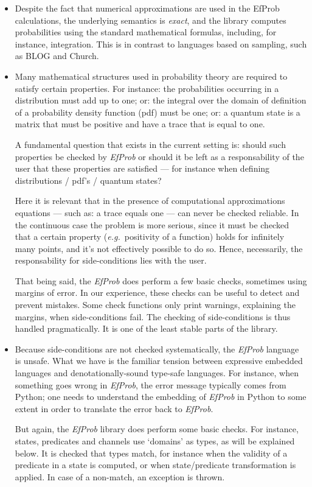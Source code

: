 \documentclass[leqno]{tufte-book} %
\newcommand{\hairsp}{\hspace{1pt}} %
\newcommand{\eg}{\textit{e.\hairsp{}g.}\xspace} %
\newcommand{\EfProb}{\textit{EfProb}\xspace}
\newcommand{\Python}{\textrm{Python}\xspace}
\begin{document}
\begin{itemize}
\item Despite the fact that numerical approximations are used in the
  EfProb calculations, the underlying semantics is \emph{exact}, and
  the library computes probabilities using the standard mathematical
  formulas, including, for instance, integration. This is in contrast
  to languages based on sampling, such as BLOG\cite{MilchMRSOK07} and
  Church\cite{GoodmanMRBT08}.

\item Many mathematical structures used in probability theory are
  required to satisfy certain properties. For instance: the
  probabilities occurring in a distribution must add up to one; or:
  the integral over the domain of definition of a probability density
  function (pdf) must be one; or: a quantum state is a matrix that
  must be positive and have a trace that is equal to one.

A fundamental question that exists in the current setting is: should
such properties be checked by \EfProb or should it be left as a
responsability of the user that these properties are satisfied --- for
instance when defining distributions / pdf's / quantum states?

Here it is relevant that in the presence of computational
approximations equations --- such as: a trace equals one --- can never
be checked reliable. In the continuous case the problem is more
serious, since it must be checked that a certain property
(\eg~positivity of a function) holds for infinitely many points, and
it's not effectively possible to do so. Hence, necessarily, the
responsability for side-conditions lies with the user.

That being said, the \EfProb does perform a few basic checks,
sometimes using margins of error. In our experience, these checks can
be useful to detect and prevent mistakes. Some check functions only
print warnings, explaining the margins, when side-conditions fail. The
checking of side-conditions is thus handled pragmatically. It is one
of the least stable parts of the library.

\item Because side-conditions are not checked systematically, the
  \EfProb language is unsafe. What we have is the familiar tension
  between expressive embedded languages and denotationally-sound
  type-safe languages. For instance, when something goes wrong in
  \EfProb, the error message typically comes from \Python; one needs
  to understand the embedding of \EfProb in \Python to some extent in
  order to translate the error back to \EfProb.

But again, the \EfProb library does perform some basic checks. For
instance, states, predicates and channels use `domains' as types, as
will be explained below. It is checked that types match, for instance
when the validity of a predicate in a state is computed, or when
state/predicate transformation is applied. In case of a non-match, an
exception is thrown.
\end{itemize}
\end{document}
